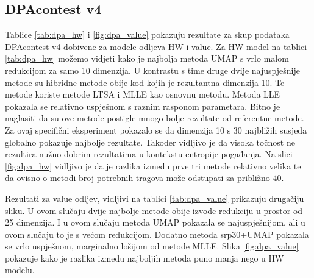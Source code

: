 \documentclass[times, utf8, diplomski]{fer}
\begin{document}
\subsection{DPAcontest v4}
Tablice \ref{tab:dpa_hw} i \ref{fig:dpa_value} pokazuju rezultate za skup podataka DPAcontest v4 dobivene za modele odljeva HW i value. Za HW model na tablici \ref{tab:dpa_hw} možemo vidjeti kako je najbolja metoda UMAP s vrlo malom redukcijom za samo 10 dimenzija. U kontrastu s time druge dvije najuspješnije metode su hibridne metode obije kod kojih je rezultantna dimenzija 10. Te metode koriste metode LTSA i MLLE kao osnovnu metodu. Metoda LLE pokazala se relativno uspješnom s raznim rasponom parametara. Bitno je naglasiti da su ove metode postigle mnogo bolje rezultate od referentne metode. Za ovaj specifični eksperiment pokazalo se da dimenzija 10 s 30 najbližih susjeda globalno pokazuje najbolje rezultate. Također vidljivo je da visoka točnost ne rezultira nužno dobrim rezultatima u kontekstu entropije pogađanja. Na slici \ref{fig:dpa_hw} vidljivo je da je razlika između prve tri metode relativno velika te da ovisno o metodi broj potrebnih tragova može odstupati za približno 40.

Rezultati za value odljev, vidljivi na tablici \ref{tab:dpa_value} prikazuju drugačiju sliku. U ovom slučaju dvije najbolje metode obije izvode redukciju u prostor od 25 dimenzija. I u ovom slučaju metoda UMAP pokazala se najuspješnijom, ali u ovom slučaju to je s većom redukcijom. Dodatno metoda srp30+UMAP pokazala se vrlo uspješnom, marginalno lošijom od metode MLLE.  Slika \ref{fig:dpa_value} pokazuje kako je razlika između najboljih metoda puno manja nego u HW modelu.
\end{document}

